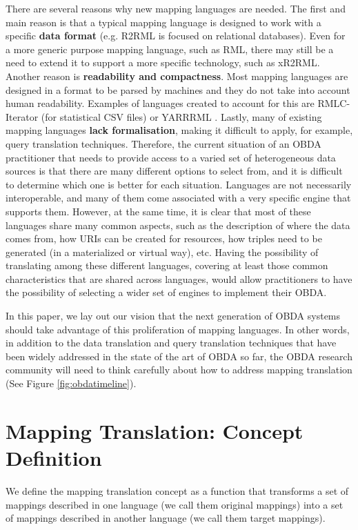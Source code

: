 There are several reasons why new mapping languages are needed. The first and main reason is that a typical mapping language is designed to work with a specific \textbf{data format} (e.g. R2RML is focused on relational databases). Even for a more generic purpose mapping language, such as RML, there may still be a need to extend it to support a more specific technology, such as xR2RML. Another reason is \textbf{readability and compactness}. Most mapping languages are designed in a format to be parsed by machines and they do not take into account human readability. Examples of languages created to account for this are RMLC-Iterator (for statistical CSV files) \citep{chaves2018virtual} or YARRRML \citep{Heyvaert2018Declarative}. Lastly, many of existing mapping languages \textbf{lack formalisation}, making it difficult to apply, for example, query translation techniques. 
Therefore, the current situation of an OBDA practitioner that needs to provide access to a varied set of heterogeneous data sources is that there are many different options to select from, and it is difficult to determine which one is better for each situation. Languages are not necessarily interoperable, and many of them come associated with a very specific engine that supports them. However, at the same time, it is clear that most of these languages share many common aspects, such as the description of where the data comes from, how URIs can be created for resources, how triples need to be generated (in a materialized or virtual way), etc. Having the possibility of translating among these different languages, covering at least those common characteristics that are shared across languages, would allow practitioners to have the possibility of selecting a wider set of engines to implement their OBDA.

In this paper, we lay out our vision that the next generation of OBDA systems should take advantage of this proliferation of mapping languages. In other words, in addition to the data translation and query translation techniques that have been widely addressed in the state of the art of OBDA so far, the OBDA research community will need to think carefully about how to address mapping translation (See Figure \ref{fig:obdatimeline}).


\section{Mapping Translation: Concept Definition}
We define the mapping translation concept as a function that transforms a set of mappings described in one language (we call them original mappings) into a set of mappings described in another language (we call them target mappings). 

